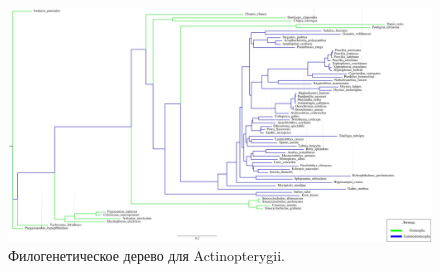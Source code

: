 \begin{figure}[hb] %
    \centering
    \includegraphics[width=1.0\textwidth]{images/Actinopterygii_tree}
    \caption{Филогенетическое дерево для Actinopterygii.}
    \label{fig:Actinopterygii_tree}
\end{figure}